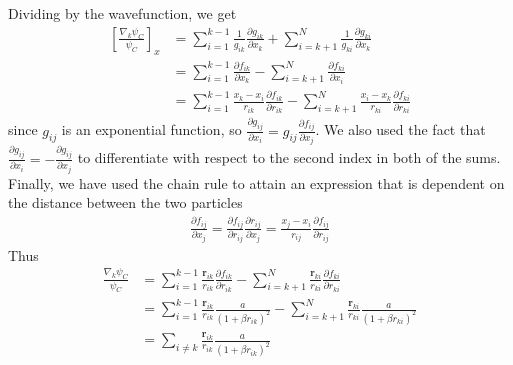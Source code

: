 \documentclass[twocolumn,8pt]{extarticle}
\newcommand{\eq}[1]{{\tiny\begin{align*}#1\end{align*}}}
\renewcommand\vec[1]{\mathbf{#1}}
\begin{document}
Dividing by the wavefunction, we get
\eq{
  \left[\frac{\nabla_k\psi_C}{\psi_C}\right]_x
  &=\sum_{i=1}^{k-1}\frac{1}{g_{ik}}\frac{\partial g_{ik}}{\partial x_k}  
  + \sum_{i=k+1}^{N}\frac{1}{g_{ki}}\frac{\partial g_{ki}}{\partial x_k} \\
  &=\sum_{i=1}^{k-1}\frac{\partial f_{ik}}{\partial x_k}  
  - \sum_{i=k+1}^{N}\frac{\partial f_{ki}}{\partial x_i}\\
  &=\sum_{i=1}^{k-1}\frac{x_k-x_i}{r_{ik}}\frac{\partial f_{ik}}{\partial r_{ik}}  
  - \sum_{i=k+1}^{N}\frac{x_i-x_k}{r_{ki}}\frac{\partial f_{ki}}{\partial r_{ki}}
}
since $g_{ij}$ is an exponential function, so
$\frac{\partial g_{ij}}{\partial x_i} = g_{ij} \frac{\partial f_{ij}}{\partial x_j}$.
We also used the fact that $\frac{\partial g_{ij}}{\partial x_i} = -\frac{\partial g_{ij}}{\partial x_j}$ to differentiate with respect to the second index in both of the sums.
Finally, we have used the chain rule to attain an expression that is dependent
on the distance between the two particles
\eq{
  \frac{\partial f_{ij}}{\partial x_j} 
  = \frac{\partial f_{ij}}{\partial r_{ij}} \frac{\partial r_{ij}}{\partial x_j} 
  = \frac{x_j - x_i}{r_{ij}} \frac{\partial f_{ij}}{\partial r_{ij}}
}
Thus
\eq{
  \frac{\nabla_k\psi_C}{\psi_C} &=
    \sum_{i=1}^{k-1}\frac{\vec r_{ik}}{r_{ik}}\frac{\partial f_{ik}}{\partial r_{ik}}  
    - \sum_{i=k+1}^{N}\frac{\vec r_{ki}}{r_{ki}}\frac{\partial f_{ki}}{\partial r_{ki}}\\
    &=\sum_{i=1}^{k-1}\frac{\vec r_{ik}}{r_{ik}}\frac{a}{(1+\beta r_{ik})^2}  
    - \sum_{i=k+1}^{N}\frac{\vec r_{ki}}{r_{ki}}\frac{a}{(1+\beta r_{ki})^2}\\
    &=\sum_{i\neq k}\frac{\vec r_{ik}}{r_{ik}}\frac{a}{(1+\beta r_{ik})^2} 
}
\end{document}
